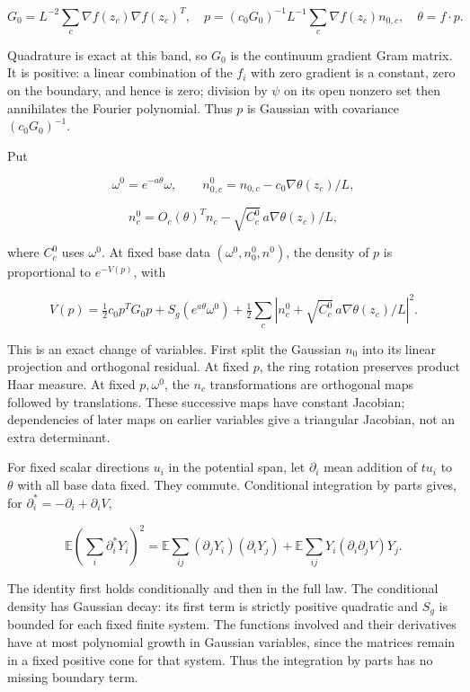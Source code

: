 \[
G_0=L^{-2}\sum_c\nabla f(z_c)\nabla f(z_c)^T,
\quad
p=(c_0G_0)^{-1}L^{-1}\sum_c\nabla f(z_c)n_{0,c},
\quad \theta=f\cdot p.
\]

Quadrature is exact at this band, so \(G_0\) is the continuum gradient Gram matrix. It is positive: a linear combination of the \(f_i\) with zero gradient is a constant, zero on the boundary, and hence is zero; division by \(\psi\) on its open nonzero set then annihilates the Fourier polynomial. Thus \(p\) is Gaussian with covariance \((c_0G_0)^{-1}\).

Put

\[
\omega^0=e^{-a\theta}\omega,\qquad
n_{0,c}^0=n_{0,c}-c_0\nabla\theta(z_c)/L,
\]

\[
n_c^0=O_c(\theta)^Tn_c-\sqrt{C_c^0}\,a\nabla\theta(z_c)/L,
\]

where \(C_c^0\) uses \(\omega^0\). At fixed base data \((\omega^0,n_0^0,n^0)\), the density of \(p\) is proportional to \(e^{-V(p)}\), with

\begin{equation}
V(p)=\tfrac12c_0p^TG_0p+S_g(e^{a\theta}\omega^0)
+\tfrac12\sum_c|n_c^0+\sqrt{C_c^0}\,a\nabla\theta(z_c)/L|^2.
\label{eq:pre:4-4}
\end{equation}

This is an exact change of variables. First split the Gaussian \(n_0\) into its linear projection and orthogonal residual. At fixed \(p\), the ring rotation preserves product Haar measure. At fixed \(p,\omega^0\), the \(n_c\) transformations are orthogonal maps followed by translations. These successive maps have constant Jacobian; dependencies of later maps on earlier variables give a triangular Jacobian, not an extra determinant.

For fixed scalar directions \(u_i\) in the potential span, let \(\partial_i\) mean addition of \(tu_i\) to \(\theta\) with all base data fixed. They commute. Conditional integration by parts gives, for \(\partial_i^*=-\partial_i+\partial_iV\),

\begin{equation}
\mathbb E\left(\sum_i\partial_i^*Y_i\right)^2
=\mathbb E\sum_{ij}(\partial_jY_i)(\partial_iY_j)
+\mathbb E\sum_{ij}Y_i(\partial_i\partial_jV)Y_j.
\label{eq:pre:4-5}
\end{equation}

The identity first holds conditionally and then in the full law. The conditional density has Gaussian decay: its first term is strictly positive quadratic and \(S_g\) is bounded for each fixed finite system. The functions involved and their derivatives have at most polynomial growth in Gaussian variables, since the matrices remain in a fixed positive cone for that system. Thus the integration by parts has no missing boundary term.


